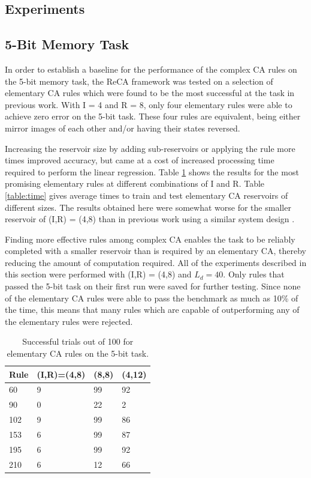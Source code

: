 \documentclass{elsarticle}
\begin{document}
\begin{multicols}{2}
    \section{Experiments}\label{experiment}
\subsection{5-Bit Memory Task}
In order to establish a baseline for the performance of the complex CA rules on 
    the 5-bit memory task, the ReCA framework was tested on a selection of 
    elementary CA rules which were found to be the most successful at the task 
    in previous work\cite{yilmaz2014reservoir}\cite{bye2016investigation}. With 
    I = 4 and R = 8, only four elementary rules were able to achieve zero error 
    on the 5-bit task. These four rules are equivalent, being either mirror 
    images of each other and/or having their states reversed.\par Increasing 
    the reservoir size by adding sub-reservoirs or applying the rule more times 
    improved accuracy, but came at a cost of increased processing time required 
    to perform the linear regression.  Table \ref{table:elementary} shows the 
    results for the most promising elementary rules at different combinations 
    of I and R.  Table \ref{table:time} gives average times to train and test 
    elementary CA reservoirs of different sizes. The results obtained here were 
    somewhat worse for the smaller reservoir of (I,R) = (4,8) than in previous 
    work using a similar system design  
    \cite{bye2016investigation}\cite{yilmaz2014reservoir}\cite{nichele2017reservoir}.  
    \par Finding more effective rules among complex CA enables the task to be 
    reliably completed with a smaller reservoir than is required by an 
    elementary CA, thereby reducing the amount of computation required. All of 
    the experiments described in this section were performed with (I,R) = (4,8) 
    and $L_{d} = 40$.  Only rules that passed the 5-bit task on their first run 
    were saved for further testing. Since none of the elementary CA rules were 
    able to pass the benchmark as much as 10\% of the time, this means that 
    many rules which are capable of outperforming any of the elementary rules 
    were rejected. 


\begin{table}[H] \centering
\begin{tabular}{|l|l|l|l|}
\hline
\textbf{Rule} & \textbf{(I,R)=(4,8)} & \textbf{(8,8)} & \textbf{(4,12)} \\ 
\hline
60 & 9 & 99 & 92 \\ \hline
90 & 0 & 22 & 2  \\ \hline
102 & 9 & 99 & 86 \\ \hline
153 & 6 & 99 & 87 \\ \hline
195 & 6 & 99 & 92 \\ \hline
210 & 6 & 12 & 66 \\ \hline
\end{tabular}
\caption{Successful trials out of 100 for elementary CA rules on the 5-bit 
    task.}
\label{table:elementary}
\end{table}


\end{multicols}
\end{document}
